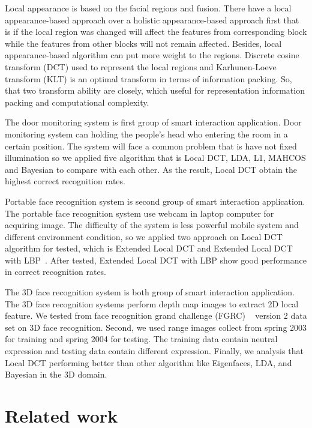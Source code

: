 \documentclass[a4paper,12pt]{article}
\begin{document}
Local appearance is based on the facial regions and fusion. There have a local appearance-based approach over a holistic appearance-based approach first that is if the local region was changed will affect the features from corresponding block while the features from other blocks will not remain affected. Besides, local appearance-based algorithm can put more weight to the regions.
Discrete cosine transform (DCT) used to represent the local regions and Karhunen-Loeve transform (KLT) is an optimal transform in terms of information packing. So, that two transform ability are closely, which useful for representation information packing and computational complexity. 

The door monitoring system is first group of smart interaction application. 
Door monitoring system can holding the people’s head who entering the room in a certain position. The system will face a common problem that is have not fixed illumination so we applied five algorithm that is Local DCT, LDA, L1, MAHCOS and Bayesian to compare with each other. As the result, Local DCT obtain the highest correct recognition rates.

Portable face recognition system is second group of smart interaction application.  The portable face recognition system use webcam in laptop computer for acquiring image. The difficulty of the system is less powerful mobile system and different environment condition, so we applied two approach on Local DCT algorithm for tested, which is Extended Local DCT and Extended Local DCT with LBP~\cite{1717463}. After tested, Extended Local DCT with LBP show good performance in correct recognition rates.

The 3D face recognition system is both group of smart interaction application. The 3D face recognition systems perform depth map images to extract 2D local feature. We tested from face recognition grand challenge (FGRC) ~\cite{1467368} version 2 data set on 3D face recognition. Second, we used range images collect from spring 2003 for training and spring 2004 for testing. The training data contain neutral expression and testing data contain different expression. Finally, we analysis that Local DCT performing better than other algorithm like Eigenfaces, LDA, and Bayesian in the 3D domain.\\

\section{Related work} 
\end{document}
